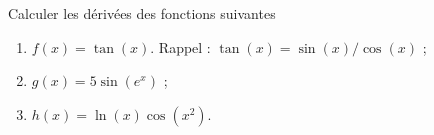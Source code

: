 
\begin{exercice}\label{exoECdecembre2010-0002}

 Calculer les dérivées des fonctions suivantes 
 \begin{enumerate}
 \item $f(x)=\tan(x)$. Rappel : $\tan(x)=\sin(x)/\cos(x)$ ;
 \item $g(x)=5\sin(e^{x})$ ;
 \item $h(x)=\ln(x)\cos(x^2)$.
 \end{enumerate}

\end{exercice}
